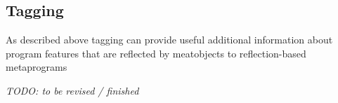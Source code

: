 \subsection{Tagging}

As described above tagging can provide useful
additional information about program features
that are reflected by meatobjects to reflection-based
metaprograms

{\em TODO: to be revised / finished}
